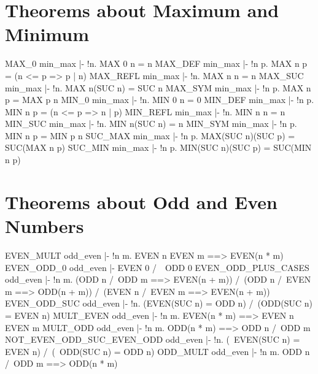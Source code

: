 \section{Theorems about Maximum and Minimum}
\THEOREM MAX\_0 min\_max
|- !n. MAX 0 n = n
\ENDTHEOREM
\THEOREM MAX\_DEF min\_max
|- !n p. MAX n p = (n <= p => p | n)
\ENDTHEOREM
\THEOREM MAX\_REFL min\_max
|- !n. MAX n n = n
\ENDTHEOREM
\THEOREM MAX\_SUC min\_max
|- !n. MAX n(SUC n) = SUC n
\ENDTHEOREM
\THEOREM MAX\_SYM min\_max
|- !n p. MAX n p = MAX p n
\ENDTHEOREM
\THEOREM MIN\_0 min\_max
|- !n. MIN 0 n = 0
\ENDTHEOREM
\THEOREM MIN\_DEF min\_max
|- !n p. MIN n p = (n <= p => n | p)
\ENDTHEOREM
\THEOREM MIN\_REFL min\_max
|- !n. MIN n n = n
\ENDTHEOREM
\THEOREM MIN\_SUC min\_max
|- !n. MIN n(SUC n) = n
\ENDTHEOREM
\THEOREM MIN\_SYM min\_max
|- !n p. MIN n p = MIN p n
\ENDTHEOREM
\THEOREM SUC\_MAX min\_max
|- !n p. MAX(SUC n)(SUC p) = SUC(MAX n p)
\ENDTHEOREM
\THEOREM SUC\_MIN min\_max
|- !n p. MIN(SUC n)(SUC p) = SUC(MIN n p)
\ENDTHEOREM
\section{Theorems about Odd and Even Numbers}
\THEOREM EVEN\_MULT odd\_even
|- !n m. EVEN n \/ EVEN m ==> EVEN(n * m)
\ENDTHEOREM
\THEOREM EVEN\_ODD\_0 odd\_even
|- EVEN 0 /\ ~ODD 0
\ENDTHEOREM
\THEOREM EVEN\_ODD\_PLUS\_CASES odd\_even
|- !n m.
    (ODD n /\ ODD m ==> EVEN(n + m)) /\
    (ODD n /\ EVEN m ==> ODD(n + m)) /\
    (EVEN n /\ EVEN m ==> EVEN(n + m))
\ENDTHEOREM
\THEOREM EVEN\_ODD\_SUC odd\_even
|- !n. (EVEN(SUC n) = ODD n) /\ (ODD(SUC n) = EVEN n)
\ENDTHEOREM
\THEOREM MULT\_EVEN odd\_even
|- !n m. EVEN(n * m) ==> EVEN n \/ EVEN m
\ENDTHEOREM
\THEOREM MULT\_ODD odd\_even
|- !n m. ODD(n * m) ==> ODD n /\ ODD m
\ENDTHEOREM
\THEOREM NOT\_EVEN\_ODD\_SUC\_EVEN\_ODD odd\_even
|- !n. (~EVEN(SUC n) = EVEN n) /\ (~ODD(SUC n) = ODD n)
\ENDTHEOREM
\THEOREM ODD\_MULT odd\_even
|- !n m. ODD n /\ ODD m ==> ODD(n * m)
\ENDTHEOREM
